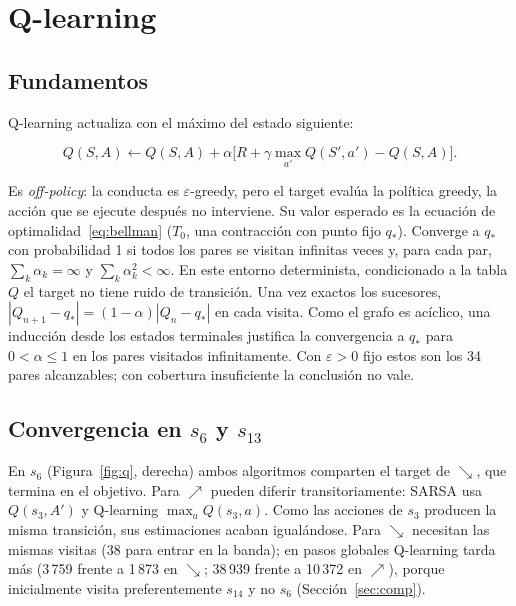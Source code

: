 \documentclass[11pt,a4paper]{article}
\newcommand{\UR}{{\nearrow}}
\newcommand{\DR}{{\searrow}}
\begin{document}

\newpage

\section{Q-learning}

\subsection{Fundamentos}



Q-learning actualiza con el máximo del estado siguiente:

\begin{equation}
Q(S,A)\leftarrow Q(S,A)+\alpha\big[R+\gamma\max_{a'}Q(S',a')-Q(S,A)\big].
\end{equation}

Es \emph{off-policy}: la conducta es $\varepsilon$-greedy, pero el target evalúa la política greedy, la acción que se ejecute después no interviene. Su valor esperado es la ecuación de optimalidad~\eqref{eq:bellman} ($T_0$, una contracción con punto fijo $q_*$). Converge a $q_*$ con probabilidad 1 si todos los pares se visitan infinitas veces y, para cada par, $\sum_k\alpha_k=\infty$ y $\sum_k\alpha_k^2<\infty$. En este entorno determinista, condicionado a la tabla $Q$ el target no tiene ruido de transición. Una vez exactos los sucesores, $|Q_{n+1}-q_*|=(1-\alpha)|Q_n-q_*|$ en cada visita. Como el grafo es acíclico, una inducción desde los estados terminales justifica la convergencia a $q_*$ para $0<\alpha\le1$ en los pares visitados infinitamente. Con $\varepsilon>0$ fijo estos son los 34 pares alcanzables; con cobertura insuficiente la conclusión no vale.



\subsection{Convergencia en \texorpdfstring{$s_6$}{s6} y \texorpdfstring{$s_{13}$}{s13}}



En $s_6$ (Figura~\ref{fig:q}, derecha) ambos algoritmos comparten el target de $\DR$, que termina en el objetivo. Para $\UR$ pueden diferir transitoriamente: SARSA usa $Q(s_3,A')$ y Q-learning $\max_a Q(s_3,a)$. Como las acciones de $s_3$ producen la misma transición, sus estimaciones acaban igualándose. Para $\DR$ necesitan las mismas visitas (38 para entrar en la banda); en pasos globales Q-learning tarda más (3\,759 frente a 1\,873 en $\DR$; 38\,939 frente a 10\,372 en $\UR$), porque inicialmente visita preferentemente $s_{14}$ y no $s_6$ (Sección~\ref{sec:comp}).
\end{document}
